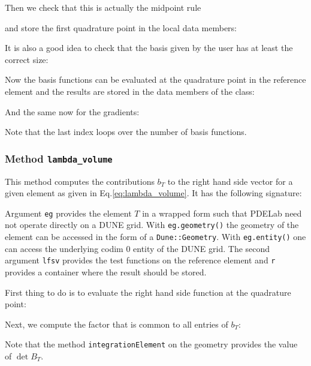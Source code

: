 \documentclass[a4paper,12pt]{article}
\begin{document}
Then we check that this is actually the midpoint rule

and store the first quadrature point in the local data members:

It is also a good idea to check that the basis given by the user
has at least the correct size:

Now the basis functions can be evaluated at the quadrature
point in the reference element and the results are stored in the 
data members of the class:

And the same now for the gradients:

Note that the last index loops over the number of basis
functions. 

\subsubsection*{Method \lstinline{lambda_volume}}

This method computes the contributions $b_T$ to the right hand side 
vector for a given element as given in Eq.\eqref{eq:lambda_volume}.
It has the following signature:

Argument \lstinline{eg} provides the element $T$ in
a wrapped form such that PDELab need not operate directly on a DUNE grid.
With \lstinline{eg.geometry()} the geometry of the element can be accessed
in the form of a \lstinline{Dune::Geometry}. With \lstinline{eg.entity()} one can
access the underlying codim 0 entity of the DUNE grid.
The second argument \lstinline{lfsv} provides the test functions on the reference
element and \lstinline{r} provides a container where the result should be stored.

First thing to do is to evaluate the right hand side function at the quadrature
point:


Next, we compute the factor that is common to all entries of $b_T$:

Note that the method \lstinline{integrationElement} on the geometry
provides the value of $\det B_T$.
\end{document}
